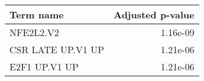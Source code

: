 \begin{tabular}{lr}
\toprule
        Term name &  Adjusted p-value \\
\midrule
        NFE2L2.V2 &          1.16e-09 \\
CSR LATE UP.V1 UP &          1.21e-06 \\
    E2F1 UP.V1 UP &          1.21e-06 \\
\bottomrule
\end{tabular}
